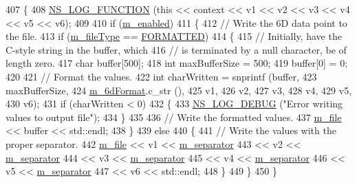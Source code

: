 \begin{DoxyCode}
407 \{
408   \hyperlink{log-macros-disabled_8h_a90b90d5bad1f39cb1b64923ea94c0761}{NS\_LOG\_FUNCTION} (\textcolor{keyword}{this} << context << v1 << v2 << v3 << v4 << v5 << v6);
409 
410   \textcolor{keywordflow}{if} (\hyperlink{classns3_1_1DataCollectionObject_a3e8b0578f03044b1db4811ecff2be7ea}{m\_enabled})
411     \{
412       \textcolor{comment}{// Write the 6D data point to the file.}
413       \textcolor{keywordflow}{if} (\hyperlink{classns3_1_1FileAggregator_aa2a8abfe3082a802dc6705e701f73e9e}{m\_fileType} == \hyperlink{classns3_1_1FileAggregator_aedb3108205a498f7ac0c564508067e2da7e34fea5d3f680d09518ee58ce4711f0}{FORMATTED})
414         \{
415           \textcolor{comment}{// Initially, have the C-style string in the buffer, which}
416           \textcolor{comment}{// is terminated by a null character, be of length zero.}
417           \textcolor{keywordtype}{char} buffer[500];
418           \textcolor{keywordtype}{int} maxBufferSize = 500;
419           buffer[0] = 0;
420 
421           \textcolor{comment}{// Format the values.}
422           \textcolor{keywordtype}{int} charWritten = snprintf (buffer,
423                                       maxBufferSize,
424                                       \hyperlink{classns3_1_1FileAggregator_ad3cbb0a4fc2b0ec4499bcae467f3a2b8}{m\_6dFormat}.c\_str (),
425                                       v1,
426                                       v2,
427                                       v3,
428                                       v4,
429                                       v5,
430                                       v6);
431           \textcolor{keywordflow}{if} (charWritten < 0)
432             \{
433               \hyperlink{group__logging_ga413f1886406d49f59a6a0a89b77b4d0a}{NS\_LOG\_DEBUG} (\textcolor{stringliteral}{"Error writing values to output file"});
434             \}
435 
436           \textcolor{comment}{// Write the formatted values.}
437           \hyperlink{classns3_1_1FileAggregator_a756affa0d614724be513ceedcff62ac0}{m\_file} << buffer << std::endl;
438         \}
439       \textcolor{keywordflow}{else}
440         \{
441           \textcolor{comment}{// Write the values with the proper separator.}
442           \hyperlink{classns3_1_1FileAggregator_a756affa0d614724be513ceedcff62ac0}{m\_file} << v1 << \hyperlink{classns3_1_1FileAggregator_a1f74a4c07f663d535da56dfb70414a15}{m\_separator}
443                  << v2 << \hyperlink{classns3_1_1FileAggregator_a1f74a4c07f663d535da56dfb70414a15}{m\_separator}
444                  << v3 << \hyperlink{classns3_1_1FileAggregator_a1f74a4c07f663d535da56dfb70414a15}{m\_separator}
445                  << v4 << \hyperlink{classns3_1_1FileAggregator_a1f74a4c07f663d535da56dfb70414a15}{m\_separator}
446                  << v5 << \hyperlink{classns3_1_1FileAggregator_a1f74a4c07f663d535da56dfb70414a15}{m\_separator}
447                  << v6 << std::endl;
448         \}
449     \}
450 \}
\end{DoxyCode}
